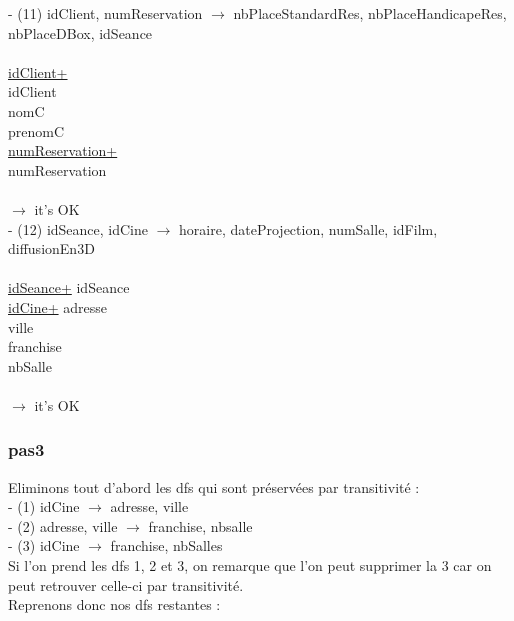 \documentclass[a4paper,sffamily,12pt]{article}
\begin{document}
						\noindent - (11) idClient, numReservation $\rightarrow$ nbPlaceStandardRes, nbPlaceHandicapeRes, nbPlaceDBox, idSeance \\
							\\
							\underline{idClient+} \\
							idClient \\
							nomC \\
							prenomC \\
							\underline{numReservation+} \\
							numReservation \\	
							\\									
						$\rightarrow$ it's OK \\					
						
						\noindent - (12) idSeance, idCine $\rightarrow$ horaire, dateProjection, numSalle, idFilm, diffusionEn3D \\												
						\\
						\underline{idSeance+}
						idSeance \\
						\underline{idCine+}
						adresse \\
						ville \\
						franchise \\
						nbSalle \\
						\\
						$\rightarrow$ it's OK \\
		
					\subsubsection{pas3}		
			
						Eliminons tout d'abord les dfs qui sont préservées par transitivité : \\
			
							\noindent- (1) idCine $\rightarrow$ adresse, ville \\
							- (2) adresse, ville $\rightarrow$ franchise, nbsalle \\
							- (3) idCine $\rightarrow$ franchise, nbSalles \\
							
							Si l'on prend les dfs 1, 2 et 3, on remarque que l'on peut supprimer la 3 car on peut retrouver celle-ci par transitivité. \\
							Reprenons donc nos dfs restantes : \\
							
\end{document}
